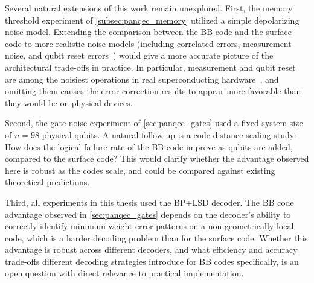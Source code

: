 
Several natural extensions of this work remain unexplored. First, the memory threshold experiment of \cref{subsec:panqec_memory} utilized a simple depolarizing noise model. Extending the comparison between the BB code and the surface code to more realistic noise models (including correlated errors, measurement noise, and qubit reset errors~\cite{Heu_en_2024, gehér2025resetresetquestion}) would give a more accurate picture of the architectural trade-offs in practice. In particular, measurement and qubit reset are among the noisiest operations in real superconducting hardware~\cite{Heu_en_2024}, and omitting them causes the error correction results to appear more favorable than they would be on physical devices.

Second, the gate noise experiment of \cref{sec:panqec_gates} used a fixed system size of $n = 98$ physical qubits. A natural follow-up is a code distance scaling study: How does the logical failure rate of the BB code improve as qubits are added, compared to the surface code? This would clarify whether the advantage observed here is robust as the codes scale, and could be compared against existing theoretical predictions.

Third, all experiments in this thesis used the BP+LSD decoder. The BB code advantage observed in \cref{sec:panqec_gates} depends on the decoder's ability to correctly identify minimum-weight error patterns on a non-geometrically-local code, which is a harder decoding problem than for the surface code. Whether this advantage is robust across different decoders, and what efficiency and accuracy trade-offs different decoding strategies introduce for BB codes specifically, is an open question with direct relevance to practical implementation.